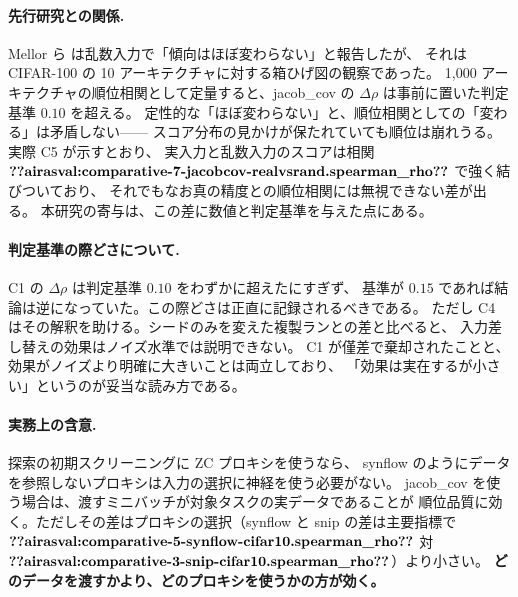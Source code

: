 \documentclass[11pt]{article}
\providecommand{\airasval}[1]{\textbf{??airasval:\detokenize{#1}??}}
\begin{document}
\paragraph{先行研究との関係.}
Mellor ら \cite{mellor2021naswot} は乱数入力で「傾向はほぼ変わらない」と報告したが、
それは CIFAR-100 の 10 アーキテクチャに対する箱ひげ図の観察であった。
1{,}000 アーキテクチャの順位相関として定量すると、jacob\_cov の
$\Delta\rho$ は事前に置いた判定基準 $0.10$ を超える。
定性的な「ほぼ変わらない」と、順位相関としての「変わる」は矛盾しない——
スコア分布の見かけが保たれていても順位は崩れうる。実際 C5 が示すとおり、
実入力と乱数入力のスコアは相関 $\airasval{comparative-7-jacobcov-realvsrand.spearman_rho}$ で強く結びついており、
それでもなお真の精度との順位相関には無視できない差が出る。
本研究の寄与は、この差に数値と判定基準を与えた点にある。

\paragraph{判定基準の際どさについて.}
C1 の $\Delta\rho$ は判定基準 $0.10$ をわずかに超えたにすぎず、
基準が $0.15$ であれば結論は逆になっていた。この際どさは正直に記録されるべきである。
ただし C4 はその解釈を助ける。シードのみを変えた複製ランとの差と比べると、
入力差し替えの効果はノイズ水準では説明できない。
C1 が僅差で棄却されたことと、効果がノイズより明確に大きいことは両立しており、
「効果は実在するが小さい」というのが妥当な読み方である。

\paragraph{実務上の含意.}
探索の初期スクリーニングに ZC プロキシを使うなら、
synflow のようにデータを参照しないプロキシは入力の選択に神経を使う必要がない。
jacob\_cov を使う場合は、渡すミニバッチが対象タスクの実データであることが
順位品質に効く。ただしその差はプロキシの選択（synflow と snip の差は主要指標で
$\airasval{comparative-5-synflow-cifar10.spearman_rho}$ 対
$\airasval{comparative-3-snip-cifar10.spearman_rho}$）より小さい。
\textbf{どのデータを渡すかより、どのプロキシを使うかの方が効く。}



\end{document}
